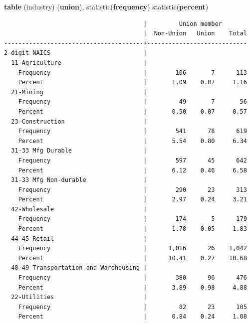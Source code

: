 \documentclass[
]{book}
\newenvironment{Shaded}{\begin{snugshade}}{\end{snugshade}}
\newcommand{\KeywordTok}[1]{\textcolor[rgb]{0.13,0.29,0.53}{\textbf{#1}}}
\newcommand{\NormalTok}[1]{#1}
\begin{document}
\begin{Shaded}
\begin{Highlighting}[]
\KeywordTok{table}\NormalTok{ (industry) (}\KeywordTok{union}\NormalTok{), statistic(}\KeywordTok{frequency}\NormalTok{) statistic(}\KeywordTok{percent}\NormalTok{)}
\end{Highlighting}
\end{Shaded}

\begin{verbatim}
                                       |         Union member       
                                       |  Non-Union   Union    Total
---------------------------------------+----------------------------
2-digit NAICS                          |                            
  11-Agriculture                       |                            
    Frequency                          |        106       7      113
    Percent                            |       1.09    0.07     1.16
  21-Mining                            |                            
    Frequency                          |         49       7       56
    Percent                            |       0.50    0.07     0.57
  23-Construction                      |                            
    Frequency                          |        541      78      619
    Percent                            |       5.54    0.80     6.34
  31-33 Mfg Durable                    |                            
    Frequency                          |        597      45      642
    Percent                            |       6.12    0.46     6.58
  31-33 Mfg Non-durable                |                            
    Frequency                          |        290      23      313
    Percent                            |       2.97    0.24     3.21
  42-Wholesale                         |                            
    Frequency                          |        174       5      179
    Percent                            |       1.78    0.05     1.83
  44-45 Retail                         |                            
    Frequency                          |      1,016      26    1,042
    Percent                            |      10.41    0.27    10.68
  48-49 Transportation and Warehousing |                            
    Frequency                          |        380      96      476
    Percent                            |       3.89    0.98     4.88
  22-Utilities                         |                            
    Frequency                          |         82      23      105
    Percent                            |       0.84    0.24     1.08

\end{verbatim}
\end{document}
